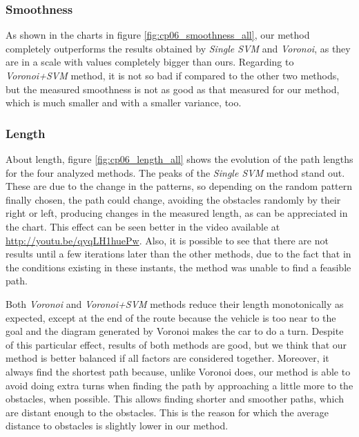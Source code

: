 \subsubsection{Smoothness}\label{ch:chapter06_02_02_02}

As shown in the charts in figure \ref{fig:cp06_smoothness_all}, our method completely outperforms the results obtained by \textit{Single \ac{SVM}} and \textit{Voronoi}, as they are in a scale with values completely bigger than ours. Regarding to \textit{Voronoi+\ac{SVM}} method, it is not so bad if compared to the other two methods, but the measured smoothness is not as good as that measured for our method, which is much smaller and with a smaller variance, too.

\subsubsection{Length}\label{ch:chapter06_02_02_03}

About length, figure \ref{fig:cp06_length_all} shows the evolution of the path lengths for the four analyzed methods. The peaks of the \textit{Single \ac{SVM}} method stand out. These are due to the change in the patterns, so depending on the random pattern finally chosen, the path could change, avoiding the obstacles randomly by their right or left, producing changes in the measured length, as can be appreciated in the chart. This effect can be seen better in the video available at \url{http://youtu.be/qyqLH1huePw}. Also, it is possible to see that there are not results until a few iterations later than the other methods, due to the fact that in the conditions existing in these instants, the method was unable to find a feasible path.

Both \textit{Voronoi} and \textit{Voronoi+\ac{SVM}} methods reduce their length monotonically as expected, except at the end of the route because the vehicle is too near to the goal and the diagram generated by Voronoi makes the car to do a turn. Despite of this particular effect, results of both methods are good, but we think that our method is better balanced if all factors are considered together. Moreover, it always find the shortest path because, unlike Voronoi does, our method is able to avoid doing extra turns when finding the path by approaching a little more to the obstacles, when possible. This allows finding shorter and smoother paths, which are distant enough to the obstacles. This is the reason for which the average distance to obstacles is slightly lower in our method.

